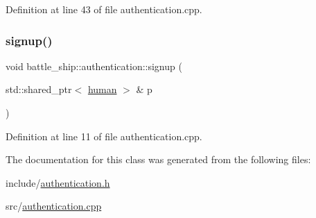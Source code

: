 Definition at line 43 of file authentication.\+cpp.

\mbox{\label{classbattle__ship_1_1authentication_aeb0c243e25547624235a562f657cfd63}} 
\subsubsection{\texorpdfstring{signup()}{signup()}}
{\footnotesize\ttfamily void battle\+\_\+ship\+::authentication\+::signup (\begin{DoxyParamCaption}\item[{std\+::shared\+\_\+ptr$<$ \hyperlink{classbattle__ship_1_1human}{human} $>$ \&}]{p }\end{DoxyParamCaption})\hspace{0.3cm}{\ttfamily [static]}}



Definition at line 11 of file authentication.\+cpp.



The documentation for this class was generated from the following files\+:\begin{DoxyCompactItemize}
\item 
include/\hyperlink{authentication_8h}{authentication.\+h}\item 
src/\hyperlink{authentication_8cpp}{authentication.\+cpp}\end{DoxyCompactItemize}
